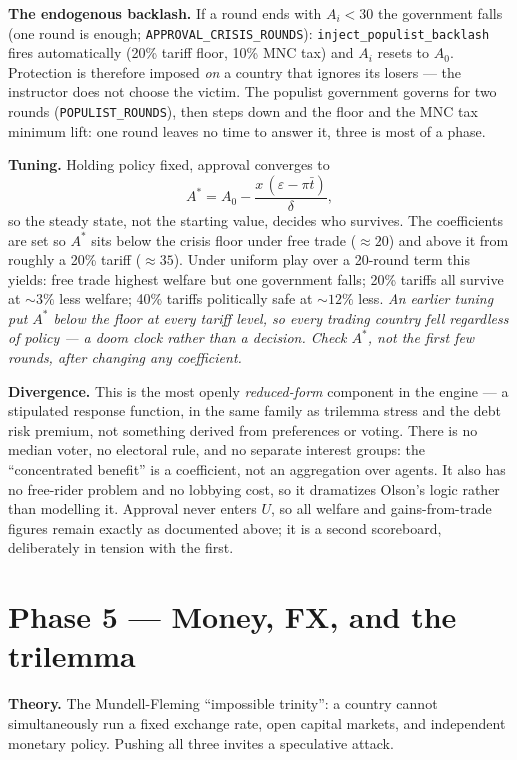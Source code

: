 \documentclass[11pt]{article}
\newcommand{\code}[1]{\texttt{#1}}
\begin{document}
\textbf{The endogenous backlash.} If a round ends with $A_i < 30$ the
government falls (one round is enough; \code{APPROVAL\_CRISIS\_ROUNDS}): \code{inject\_populist\_backlash} fires automatically (20\%
tariff floor, 10\% MNC tax) and $A_i$ resets to $A_0$. Protection is therefore
imposed \emph{on} a country that ignores its losers --- the instructor does not
choose the victim. The populist government governs for two rounds
(\code{POPULIST\_ROUNDS}), then steps down and the floor and the MNC tax minimum
lift: one round leaves no time to answer it, three is most of a phase.

\textbf{Tuning.} Holding policy fixed, approval converges to
\[
A^{*} = A_0 - \frac{x\,(\varepsilon - \pi\bar t)}{\delta},
\]
so the steady state, not the starting value, decides who survives. The
coefficients are set so $A^{*}$ sits below the crisis floor under free trade
($\approx 20$) and above it from roughly a 20\% tariff ($\approx 35$). Under
uniform play over a 20-round term this yields: free trade highest welfare but
one government falls; 20\% tariffs all survive at $\sim3\%$ less welfare; 40\%
tariffs politically safe at $\sim12\%$ less. \emph{An earlier tuning put
$A^{*}$ below the floor at every tariff level, so every trading country fell
regardless of policy --- a doom clock rather than a decision. Check $A^{*}$,
not the first few rounds, after changing any coefficient.}

\textbf{Divergence.} This is the most openly \emph{reduced-form} component in
the engine --- a stipulated response function, in the same family as trilemma
stress and the debt risk premium, not something derived from preferences or
voting. There is no median voter, no electoral rule, and no separate interest
groups: the ``concentrated benefit'' is a coefficient, not an aggregation over
agents. It also has no free-rider problem and no lobbying cost, so it dramatizes
Olson's logic rather than modelling it. Approval never enters $U$, so all welfare
and gains-from-trade figures remain exactly as documented above; it is a second
scoreboard, deliberately in tension with the first.

\section{Phase 5 --- Money, FX, and the trilemma}
\textbf{Theory.} The Mundell-Fleming ``impossible trinity'': a country cannot
simultaneously run a fixed exchange rate, open capital markets, and independent
monetary policy. Pushing all three invites a speculative attack.
\end{document}

